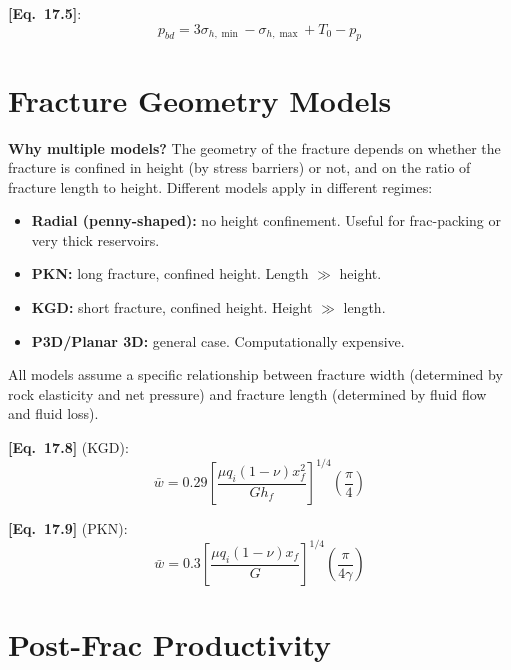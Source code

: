 \documentclass[11pt,a4paper,openany]{book}
\newcommand{\eqrefbook}[1]{\textcolor{blue!60!black}{\textbf{[Eq.~#1]}}}
\begin{document}
\eqrefbook{17.5}:
\begin{equation}
  p_{bd} = 3\sigma_{h,\min} - \sigma_{h,\max} + T_0 - p_p
\end{equation}

\section{Fracture Geometry Models}

\begin{theory}
\textbf{Why multiple models?} The geometry of the fracture depends on
whether the fracture is confined in height (by stress barriers) or
not, and on the ratio of fracture length to height. Different models
apply in different regimes:
\begin{itemize}
  \item \textbf{Radial (penny-shaped):} no height confinement. Useful
        for frac-packing or very thick reservoirs.
  \item \textbf{PKN:} long fracture, confined height. Length $\gg$
        height.
  \item \textbf{KGD:} short fracture, confined height. Height
        $\gg$ length.
  \item \textbf{P3D/Planar 3D:} general case. Computationally
        expensive.
\end{itemize}

All models assume a specific relationship between fracture width
(determined by rock elasticity and net pressure) and fracture length
(determined by fluid flow and fluid loss).
\end{theory}

\eqrefbook{17.8} (KGD):
\begin{equation}
  \bar{w} = 0.29\left[\frac{\mu q_i (1-\nu)x_f^2}{Gh_f}\right]^{1/4}
  \left(\frac{\pi}{4}\right)
\end{equation}

\eqrefbook{17.9} (PKN):
\begin{equation}
  \bar{w} = 0.3\left[\frac{\mu q_i (1-\nu)x_f}{G}\right]^{1/4}
  \left(\frac{\pi}{4\gamma}\right)
\end{equation}

\section{Post-Frac Productivity}
\end{document}

